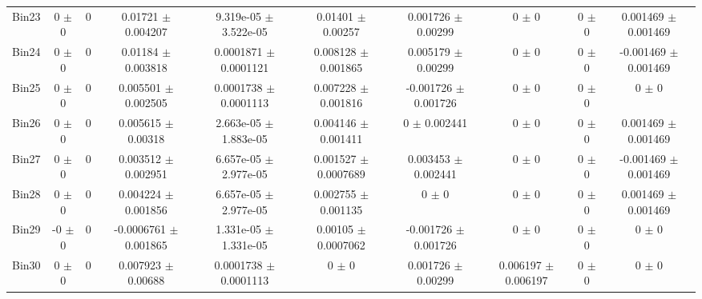 \begin{tabular}{@{\extracolsep{4pt}}lccccccccc@{}}
     Bin23 & 0 $\pm$ 0 & 0 & 0.01721 $\pm$ 0.004207 & 9.319e-05 $\pm$ 3.522e-05 & 0.01401 $\pm$ 0.00257 & 0.001726 $\pm$ 0.00299 & 0 $\pm$ 0 & 0 $\pm$ 0 & 0.001469 $\pm$ 0.001469 \\ 
     Bin24 & 0 $\pm$ 0 & 0 & 0.01184 $\pm$ 0.003818 & 0.0001871 $\pm$ 0.0001121 & 0.008128 $\pm$ 0.001865 & 0.005179 $\pm$ 0.00299 & 0 $\pm$ 0 & 0 $\pm$ 0 & -0.001469 $\pm$ 0.001469 \\ 
     Bin25 & 0 $\pm$ 0 & 0 & 0.005501 $\pm$ 0.002505 & 0.0001738 $\pm$ 0.0001113 & 0.007228 $\pm$ 0.001816 & -0.001726 $\pm$ 0.001726 & 0 $\pm$ 0 & 0 $\pm$ 0 & 0 $\pm$ 0 \\ 
     Bin26 & 0 $\pm$ 0 & 0 & 0.005615 $\pm$ 0.00318 & 2.663e-05 $\pm$ 1.883e-05 & 0.004146 $\pm$ 0.001411 & 0 $\pm$ 0.002441 & 0 $\pm$ 0 & 0 $\pm$ 0 & 0.001469 $\pm$ 0.001469 \\ 
     Bin27 & 0 $\pm$ 0 & 0 & 0.003512 $\pm$ 0.002951 & 6.657e-05 $\pm$ 2.977e-05 & 0.001527 $\pm$ 0.0007689 & 0.003453 $\pm$ 0.002441 & 0 $\pm$ 0 & 0 $\pm$ 0 & -0.001469 $\pm$ 0.001469 \\ 
     Bin28 & 0 $\pm$ 0 & 0 & 0.004224 $\pm$ 0.001856 & 6.657e-05 $\pm$ 2.977e-05 & 0.002755 $\pm$ 0.001135 & 0 $\pm$ 0 & 0 $\pm$ 0 & 0 $\pm$ 0 & 0.001469 $\pm$ 0.001469 \\ 
     Bin29 & -0 $\pm$ 0 & 0 & -0.0006761 $\pm$ 0.001865 & 1.331e-05 $\pm$ 1.331e-05 & 0.00105 $\pm$ 0.0007062 & -0.001726 $\pm$ 0.001726 & 0 $\pm$ 0 & 0 $\pm$ 0 & 0 $\pm$ 0 \\ 
     Bin30 & 0 $\pm$ 0 & 0 & 0.007923 $\pm$ 0.00688 & 0.0001738 $\pm$ 0.0001113 & 0 $\pm$ 0 & 0.001726 $\pm$ 0.00299 & 0.006197 $\pm$ 0.006197 & 0 $\pm$ 0 & 0 $\pm$ 0 \\ 
\hline\hline
  \end{tabular}
